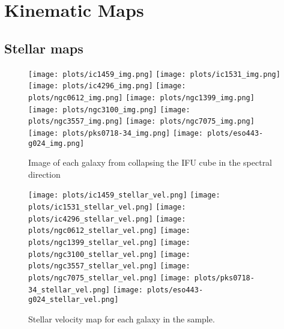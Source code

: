 \documentclass[fleqn,usenatbib,useAMS]{mnras}
\begin{document}
\section{Kinematic Maps}
	\label{sec:kinmaps}
	\subsection{Stellar maps}
		\label{subsec:stellarmaps}
		\begin{figure*}
			\centering
			\texttt{[image: plots/ic1459\_img.png]}
			\texttt{[image: plots/ic1531\_img.png]}
			\texttt{[image: plots/ic4296\_img.png]}
			\texttt{[image: plots/ngc0612\_img.png]}
			\texttt{[image: plots/ngc1399\_img.png]}
			\texttt{[image: plots/ngc3100\_img.png]}
			\texttt{[image: plots/ngc3557\_img.png]}
			\texttt{[image: plots/ngc7075\_img.png]}
			\texttt{[image: plots/pks0718-34\_img.png]}
			\texttt{[image: plots/eso443-g024\_img.png]}
			\caption{Image of each galaxy from collapsing the IFU cube in the spectral direction}
			\label{fig:image}
		\end{figure*}

		\begin{figure*}
			\centering
			\texttt{[image: plots/ic1459\_stellar\_vel.png]}
			\texttt{[image: plots/ic1531\_stellar\_vel.png]}
			\texttt{[image: plots/ic4296\_stellar\_vel.png]}
			\texttt{[image: plots/ngc0612\_stellar\_vel.png]}
			\texttt{[image: plots/ngc1399\_stellar\_vel.png]}
			\texttt{[image: plots/ngc3100\_stellar\_vel.png]}
			\texttt{[image: plots/ngc3557\_stellar\_vel.png]}
			\texttt{[image: plots/ngc7075\_stellar\_vel.png]}
			\texttt{[image: plots/pks0718-34\_stellar\_vel.png]}
			\texttt{[image: plots/eso443-g024\_stellar\_vel.png]}
			\caption{Stellar velocity map for each galaxy in the sample.}
			\label{fig:stellar_vel}
		\end{figure*}
\end{document}
